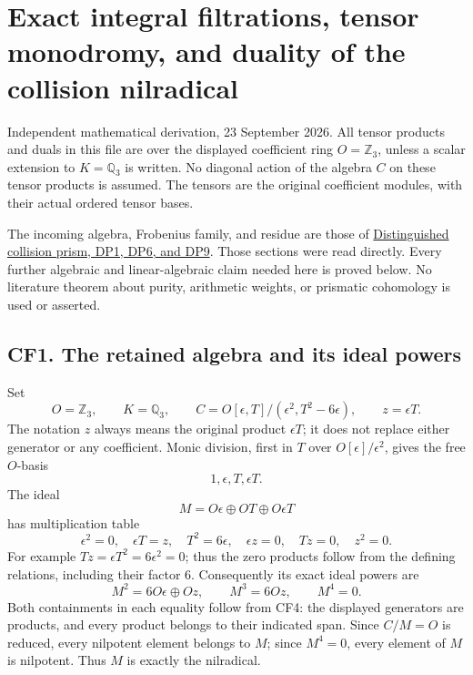 \documentclass[
  10pt,
]{article}
\author{}
\date{}
\begin{document}
\section{Exact integral filtrations, tensor monodromy, and duality of
the collision
nilradical}\label{exact-integral-filtrations-tensor-monodromy-and-duality-of-the-collision-nilradical}

Independent mathematical derivation, 23 September 2026. All tensor
products and duals in this file are over the displayed coefficient ring
\(O=\mathbb Z_3\), unless a scalar extension to \(K=\mathbb Q_3\) is
written. No diagonal action of the algebra \(C\) on these tensor
products is assumed. The tensors are the original coefficient modules,
with their actual ordered tensor bases.

The incoming algebra, Frobenius family, and residue are those of
\href{DISTINGUISHED_COLLISION_PRISM_DERIVATION.md}{Distinguished
collision prism, DP1, DP6, and DP9}. Those sections were read directly.
Every further algebraic and linear-algebraic claim needed here is proved
below. No literature theorem about purity, arithmetic weights, or
prismatic cohomology is used or asserted.

\subsection{CF1. The retained algebra and its ideal
powers}\label{cf1.-the-retained-algebra-and-its-ideal-powers}

Set \[
 O=\mathbb Z_3,\qquad K=\mathbb Q_3,\qquad
 C=O[\epsilon,T]/(\epsilon^2,T^2-6\epsilon),\qquad z=\epsilon T.
 \tag{CF1}
\] The notation \(z\) always means the original product \(\epsilon T\);
it does not replace either generator or any coefficient. Monic division,
first in \(T\) over \(O[\epsilon]/\epsilon^2\), gives the free
\(O\)-basis \[
 1,\epsilon,T,\epsilon T.
 \tag{CF2}
\] The ideal \[
 M=O\epsilon\oplus OT\oplus O\epsilon T
 \tag{CF3}
\] has multiplication table \[
 \epsilon^2=0,\quad \epsilon T=z,\quad T^2=6\epsilon,
 \quad \epsilon z=0,\quad Tz=0,\quad z^2=0.
 \tag{CF4}
\] For example \(Tz=\epsilon T^2=6\epsilon^2=0\); thus the zero products
follow from the defining relations, including their factor \(6\).
Consequently its exact ideal powers are \[
 M^2=6O\epsilon\oplus Oz,\qquad M^3=6Oz,
 \qquad M^4=0.
 \tag{CF5}
\] Both containments in each equality follow from CF4: the displayed
generators are products, and every product belongs to their indicated
span. Since \(C/M=O\) is reduced, every nilpotent element belongs to
\(M\); since \(M^4=0\), every element of \(M\) is nilpotent. Thus \(M\)
is exactly the nilradical.
\end{document}
